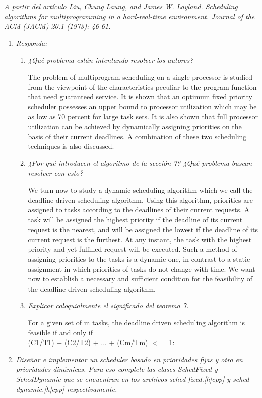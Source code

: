 \documentclass[a4paper]{article}
\begin{document}
\textit{A partir del art\'iculo Liu, Chung Laung, and James W. Layland. Scheduling algorithms for multiprogramming in a hard-real-time environment. Journal of the ACM (JACM) 20.1 (1973): 46-61.}

\begin{enumerate}
\item \textit{Responda:}

\begin{enumerate}
\item \textit{¿Qu\'e problema est\'an intentando resolver los autores?}

The problem of multiprogram scheduling on a single processor is studied from the viewpoint
of the characteristics peculiar to the program function that need guaranteed service. It is shown
that an optimum fixed priority scheduler possesses an upper bound to processor utilization
which may be as low as 70 percent for large task sets. It is also shown that full processor
utilization can be achieved by dynamically assigning priorities on the basis of their current
deadlines. A combination of these two scheduling techniques is also discussed.

\item \textit{¿Por qu\'e introducen el algoritmo de la secci\'on 7? ¿Qu\'e problema buscan resolver con esto?}

We turn now to study a dynamic scheduling algorithm which we call the deadline driven scheduling
algorithm. Using this algorithm, priorities are assigned to tasks according to the deadlines of their
current requests. A task will be assigned the highest priority if the deadline of its current request
is the nearest, and will be assigned the lowest if the deadline of its current request is the furthest.
At any instant, the task with the highest priority and yet fulfilled request will be executed. Such
a method of assigning priorities to the tasks is a dynamic one, in contrast to a static assignment
in which priorities of tasks do not change with time. We want now to establish a necessary and
sufficient condition for the feasibility of the deadline driven scheduling algorithm.

\item  \textit{Explicar coloquialmente el significado del teorema 7.}

For a given set of m tasks, the deadline driven scheduling algorithm is feasible if and
only if\\

(C1/T1) + (C2/T2) + ... + (Cm/Tm) $<=$1:

\end{enumerate}

\item \textit{Dise\~nar e implementar un scheduler basado en prioridades fijas y otro en prioridades din\'amicas. Para eso complete las clases SchedFixed y SchedDynamic que se encuentran en los archivos sched fixed.[h|cpp] y sched dynamic.[h|cpp] respectivamente.}
\end{enumerate}
\end{document}
